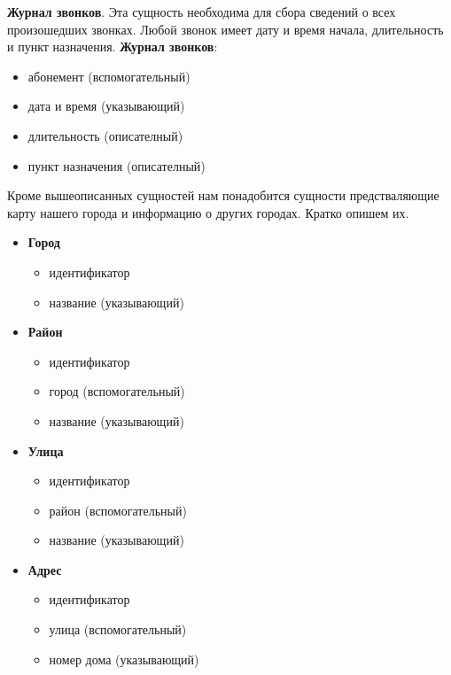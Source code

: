 \documentclass{report}
\begin{document}
\textbf{Журнал звонков}. Эта сущность необходима для сбора сведений 
о всех произошедших звонках. Любой звонок имеет дату и время начала,
длительность и пункт назначения.
\newline\textbf{Журнал звонков}:
\begin{itemize}
    \item абонемент (вспомогательный)
    \item дата и время (указывающий)
    \item длительность (описателный)
    \item пункт назначения (описателный)
\end{itemize}

Кроме вышеописанных сущностей нам понадобится сущности предстваляющие карту 
нашего города и информацию о других городах. Кратко опишем их.
\begin{itemize}
    \item[] \textbf{Город}
    \begin{itemize}
        \item идентификатор
        \item название (указывающий)
    \end{itemize}
    \item[] \textbf{Район}
    \begin{itemize}
        \item идентификатор
        \item город (вспомогательный)
        \item название (указывающий)
    \end{itemize} 
    \item[] \textbf{Улица}
    \begin{itemize}
        \item идентификатор
        \item район (вспомогательный)
        \item название (указывающий)
    \end{itemize} 
    \item[] \textbf{Адрес}
    \begin{itemize}
        \item идентификатор
        \item улица (вспомогательный)
        \item номер дома (указывающий)
    \end{itemize} 
\end{itemize}
\end{document}
